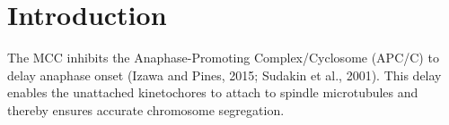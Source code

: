 \chapter{Introduction}
\label{chpt:introduction}

The MCC inhibits the Anaphase-Promoting Complex/Cyclosome (APC/C) to delay anaphase onset (Izawa and Pines, 2015; Sudakin et al., 2001). This delay enables the unattached kinetochores to attach to spindle microtubules and thereby ensures accurate chromosome segregation.






